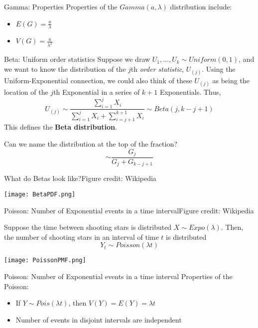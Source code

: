 \documentclass{beamer}
\begin{document}
\begin{frame}{Gamma: Properties}
Properties of the $Gamma(a,\lambda)$ distribution include:
\begin{itemize}
\item $E(G)=\frac{a}{\lambda}$
\item $V(G)=\frac{a}{\lambda^2}$
\end{itemize}
\end{frame}

\begin{frame}{Beta: Uniform order statistics}
Suppose we draw $U_1,\dots,U_k\sim Uniform(0,1)$, and we want to know the distribution of the $j$th \emph{order statistic}, $U_{(j)}$. Using the Uniform-Exponential connection, we could also think of these $U_{(j)}$ as being the location of the $j$th Exponential in a series of $k+1$ Exponentials. Thus,
$$U_{(j)}\sim \frac{\sum_{i=1}^j X_i}{\sum_{i=1}^{j} X_i+\sum_{i=j+1}^{k+1} X_i}\sim Beta(j,k-j+1)$$
This defines the \textbf{Beta distribution}.

Can we name the distribution at the top of the fraction?
\pause
$$\sim \frac{G_j}{G_j+G_{k-j+1}}$$
\end{frame}

\begin{frame}{What do Betas look like?}{Figure credit: Wikipedia}
\begin{center}\texttt{[image: BetaPDF.png]}\end{center}
\end{frame}

\begin{frame}{Poisson: Number of Exponential events in a time interval}{Figure credit: Wikipedia}
\begin{definition}
Suppose the time between shooting stars is distributed $X\sim Expo(\lambda)$. Then, the number of shooting stars in an interval of time $t$ is distributed
$$Y_t\sim Poisson(\lambda t)$$
\end{definition}
\begin{center}\texttt{[image: PoissonPMF.png]}\end{center}
\end{frame}

\begin{frame}{Poisson: Number of Exponential events in a time interval}
Properties of the Poisson:
\begin{itemize}
\item If $Y\sim Pois(\lambda t)$, then $V(Y)=E(Y)=\lambda t$
\item Number of events in disjoint intervals are independent
\end{itemize}
\end{frame}
\end{document}
